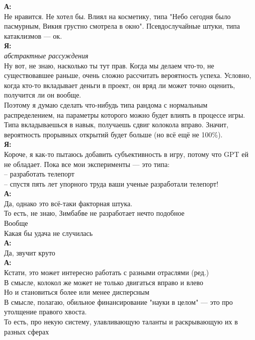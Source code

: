 \begin{tabbing}
\textbf{А:}\\
Не нравится. Не хотел бы. Влиял на косметику, типа "Небо сегодня было пасмурным, Викия грустно смотрела в окно". Псевдослучайные штуки, типа катаклизмов — ок.\\

\textbf{Я:}\\
\textit{абстрактные рассуждения}\\
Ну вот, не знаю, насколько ты тут прав. Когда мы делаем что-то, не существовавшее раньше, очень сложно рассчитать вероятность успеха. Условно, когда кто-то вкладывает деньги в проект, он вряд ли может точно оценить, получится ли он вообще.\\

Поэтому я думаю сделать что-нибудь типа рандома с нормальным распределением, на параметры которого можно будет влиять в процессе игры. Типа вкладываешься в навык, получаешь сдвиг колокола вправо. Значит, вероятность прорывных открытий будет больше (но всё ещё не 100\%).\\
\textbf{Я:}\\
Короче, я как-то пытаюсь добавить субъективность в игру, потому что GPT ей не обладает. Пока все мои эксперименты — это типа:\\
– разработать телепорт\\
– спустя пять лет упорного труда ваши ученые разработали телепорт!\\

\textbf{А:}\\
Да, однако это всё-таки факторная штука.\\
То есть, не знаю, Зимбабве не разработает нечто подобное\\
Вообще\\
Какая бы удача не случилась\\

\textbf{А:}\\
Да, звучит круто\\

\textbf{А:}\\
Кстати, это может интересно работать с разными отраслями (ред.)\\

В смысле, колокол же может не только двигаться вправо и влево\\
Но и становиться более или менее дисперсным\\

В смысле, полагаю, обильное финансирование "науки в целом" — это про утолщение правого хвоста.\\
То есть, про некую систему, улавливающую таланты и раскрывающую их в разных сферах\\


\end{tabbing}
